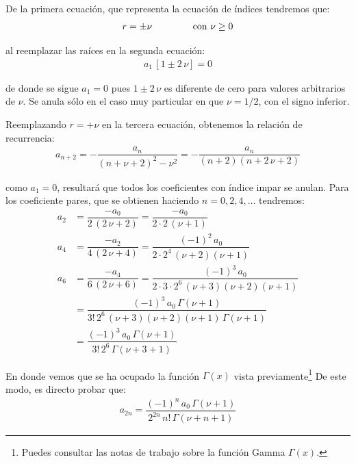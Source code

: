 De la primera ecuación, que representa la ecuación de índices tendremos que:
\begin{align}
r = \pm \nu \hspace{1.5cm} \mbox{con } \nu \geq 0
\label{eq:ecuacion_08_04}
\end{align}

al reemplazar las raíces en la segunda ecuación:
\begin{align*}
a_{1} \, [1 \pm 2 \, \nu] = 0
\end{align*}

de donde se sigue $a_{1} = 0$ pues $1 \pm 2 \, \nu$ es diferente de cero para valores arbitrarios de $\nu$. Se anula sólo en el caso muy particular en que $\nu = 1/2$, con el signo inferior.
\par
Reemplazando $r = + \nu$ en la tercera ecuación, obtenemos la relación de recurrencia:
\begin{align*}
a_{n+2} = - \dfrac{a_{n}}{(n + \nu + 2)^{2} - \nu^{2}} = - \dfrac{a_{n}}{(n + 2)(n + 2 \, \nu + 2)}
\end{align*}

\noindent
como $a_{1} = 0$, resultará que todos los coeficientes con índice impar se anulan. Para los coeficiente pares, que se obtienen haciendo $n = 0, 2, 4, \ldots$ tendremos:
\begin{align*}
a_{2} &= \dfrac{-a_{0}}{2 \, (2 \, \nu + 2)} = \dfrac{-a_{0}}{2 \cdot 2 \, (\nu + 1)} \\[0.75em]
a_{4} &= \dfrac{-a_{2}}{4 \, (2 \, \nu + 4)} = \dfrac{(-1)^{2} \, a_{0}}{2 \cdot 2^{4} \, (\nu + 2)(\nu + 1)} \\[0.75em]
a_{6} &= \dfrac{-a_{4}}{6 \, (2 \, \nu + 6)} = \dfrac{(-1)^{3} \, a_{0}}{2 \cdot 3 \cdot 2^{6} \, (\nu + 3)(\nu + 2)(\nu + 1)} \\[0.75em]
&= \dfrac{(-1)^{3} \, a_{0} \, \Gamma (\nu + 1)}{3! \, 2^{6} \, (\nu + 3)(\nu + 2)(\nu + 1) \, \Gamma (\nu + 1)} \\[0.75em]
&= \dfrac{(-1)^{3} \, a_{0} \, \Gamma (\nu + 1)}{3! \, 2^{6} \, \Gamma (\nu + 3 + 1)}
\end{align*}

En donde vemos que se ha ocupado la función $\Gamma(x)$ vista previamente\footnote{Puedes consultar las notas de trabajo sobre la función Gamma $\Gamma(x)$.} De este modo, es directo probar que:
\begin{align}
a_{2n} = \dfrac{(-1)^{n} \, a_{0} \, \Gamma (\nu + 1)}{2^{2n} \, n! \, \Gamma (\nu + n + 1)}
\label{eq:ecuacion_08_05}
\end{align}

